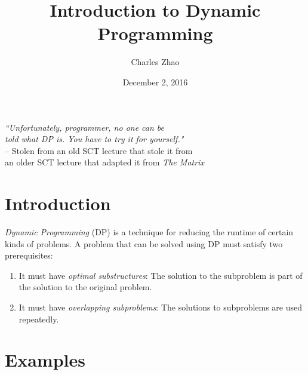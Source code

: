 \documentclass[11pt]{article}
\title{Introduction to Dynamic Programming}
\author{Charles Zhao}
\date{December 2, 2016}
\begin{document}
\maketitle


\begin{center}
    \textit{``Unfortunately, programmer, no one can be\\ told what DP is.
You have to try it for yourself."}\\
    \medskip
    -- Stolen from an old SCT lecture that stole it from\\ an older SCT lecture that adapted it from \textit{The Matrix}
\end{center}


\section{Introduction}
\textit{Dynamic Programming} (DP) is a technique for reducing the runtime of certain kinds of problems. A problem that can be solved using DP must satisfy two prerequisites:
\begin{enumerate}
    \item It must have \textit{optimal substructures}: The solution to the subproblem is part of the solution to the original problem.
\item It must have \textit{overlapping subproblems}: The solutions to subproblems are used repeatedly.
\end{enumerate}


\section{Examples}
\end{document}
